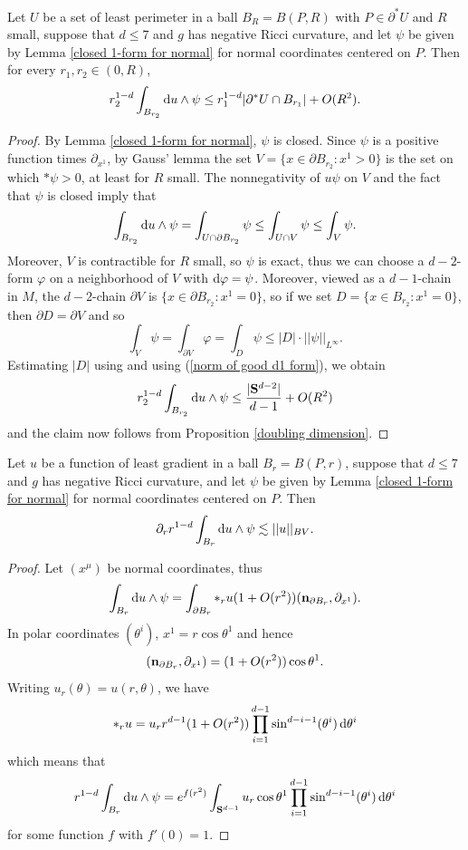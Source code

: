 \begin{lemma}\label{scalar curvature monotonicity}
Let $U$ be a set of least perimeter in a ball $B_R = B(P, R)$ with $P \in \partial^* U$ and $R$ small, suppose that $d \leq 7$ and $g$ has negative Ricci curvature, and let $\psi$ be given by Lemma \ref{closed 1-form for normal} for normal coordinates centered on $P$.
Then for every $r_1, r_2 \in (0, R)$,
$$r_2^{1 - d}\int_{B_{r_2}} \mathop{}\!\mathrm{d} u \wedge \psi \leq r_1^{1 - d}|\partial^*U \cap B_{r_1}| + O(R^2).$$
\end{lemma}
\begin{proof}
By Lemma \ref{closed 1-form for normal}, $\psi$ is closed.
Since $\psi$ is a positive function times $\partial_{x^1}$, by Gauss' lemma the set $V = \{x \in \partial B_{r_2}: x^1 > 0\}$ is the set on which $*\psi > 0$, at least for $R$ small.
The nonnegativity of $u\psi$ on $V$ and the fact that $\psi$ is closed imply that
$$\int_{B_{r_2}} \mathop{}\!\mathrm{d} u \wedge \psi = \int_{U \cap \partial B_{r_2}} \psi \leq \int_{U \cap V} \psi \leq \int_V \psi.$$
Moreover, $V$ is contractible for $R$ small, so $\psi$ is exact, thus we can choose a $d-2$-form $\varphi$ on a neighborhood of $V$ with $\mathop{}\!\mathrm{d} \varphi = \psi$.
Moreover, viewed as a $d-1$-chain in $M$, the $d-2$-chain $\partial V$ is $\{x \in \partial B_{r_2}: x^1 = 0\}$, so if we set $D = \{x \in B_{r_2}: x^1 = 0\}$, then $\partial D = \partial V$ and so
$$\int_V \psi = \int_{\partial V} \varphi = \int_D \psi \leq |D| \cdot ||\psi||_{L^\infty}.$$
Estimating $|D|$ using \cite{gray1974volume} and using (\ref{norm of good d1 form}), we obtain
$$r_2^{1 - d} \int_{B_{r_2}} \mathop{}\!\mathrm{d} u \wedge \psi \leq \frac{|\mathbf S^{d - 2}|}{d - 1} + O(R^2)$$
and the claim now follows from Proposition \ref{doubling dimension}.
\end{proof}

\begin{lemma}\label{bounding the G}
Let $u$ be a function of least gradient in a ball $B_r = B(P, r)$, suppose that $d \leq 7$ and $g$ has negative Ricci curvature, and let $\psi$ be given by Lemma \ref{closed 1-form for normal} for normal coordinates centered on $P$. Then 
$$\partial_r r^{1 - d} \int_{B_r} \mathop{}\!\mathrm{d} u \wedge \psi \lesssim ||u||_{BV}.$$
\end{lemma}
\begin{proof}
Let $(x^\mu)$ be normal coordinates, thus
$$\int_{B_r} \mathop{}\!\mathrm{d} u \wedge \psi = \int_{\partial B_r} *_r u(1 + O(r^2))(\mathbf n_{\partial B_r}, \partial_{x^1}).$$
In polar coordinates $(\theta^i)$, $x^1 = r \cos \theta^1$ and hence
$$(\mathbf n_{\partial B_r}, \partial_{x^1}) = (1 + O(r^2)) \cos \theta^1.$$
Writing $u_r(\theta) = u(r, \theta)$, we have
$$*_r u = u_r r^{d - 1}(1 + O(r^2)) \prod_{i=1}^{d - 1} \sin^{d - i - 1}(\theta^i) \mathop{}\!\mathrm{d} \theta^i$$
which means that 
$$r^{1 - d} \int_{B_r} \mathop{}\!\mathrm{d} u \wedge \psi = e^{f(r^2)} \int_{\mathbf S^{d - 1}} u_r \cos \theta^1 \prod_{i=1}^{d - 1} \sin^{d - i - 1}(\theta^i) \mathop{}\!\mathrm{d} \theta^i$$
for some function $f$ with $f'(0) = 1$.

\end{proof}

